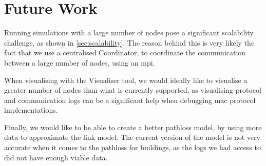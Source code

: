 \clearpage
\section{Future Work}
Running simulations with a large number of nodes pose a significant scalability challenge, as shown in
\autoref{sec:scalability}. The reason behind this is very likely the fact that we use a centralised
Coordinator, to coordinate the communication between a large number of nodes, using an \gls{mpi}. \smallbreak

When visualising with the Visualiser tool, we would ideally like to visualise a greater number of nodes than
what is currently supported, as visualising protocol and communication logs can be a significant help when
debugging \gls{mac} protocol implementations. \smallbreak

Finally, we would like to be able to create a better \gls{pathloss} model, by using more data to approximate
the link model. The current version of the model is not very accurate when it comes to the \gls{pathloss} for
buildings, as the logs we had access to did not have enough viable data.



